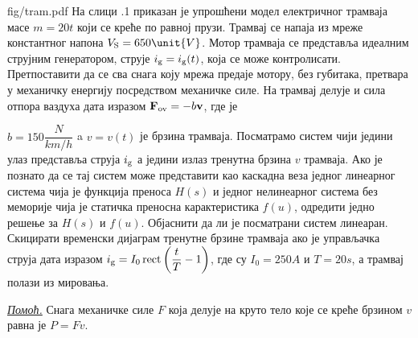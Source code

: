 \newpage
\begin{slikaDesno}[0.83]{fig/tram.pdf}
    \PID 
На слици \ID.1 приказан је упрошћени модел 
електричног трамваја масе $m = 20\unit{t}$ који
се креће по равној прузи. Трамвај 
се напаја из мреже константног напона $V_{\rm S} = 
650\unit{V}$. Мотор трамваја се представља 
идеалним струјним генератором, струје 
$i_{\rm g} = i_{\rm g}(t)$, која се 
може контролисати. Претпоставити да се сва снага
коју мрежа предаје мотору, без губитака, претвара у механичку 
енергију посредством механичке силе. 
На трамвај делује и сила отпора ваздуха
дата изразом ${\bf F}_{\rm ov} = -b {\bf v}$, где је\linebreak 
\vspace*{-3mm}
\end{slikaDesno} 
$b = 150\unit{\dfrac{N}{km/h}}$ a 
$v = v(t)$ је брзина трамваја.
Посматрамо систем чији једини
улаз представља струја $i_{\rm g}$ а једини
излаз тренутна брзина $v$ трамваја. 
Ако је познато да се тај систем може представити 
као каскадна веза једног линеарног система 
чија је функција преноса $H(s)$ и једног 
нелинеарног система без меморије чија је 
статичка преносна карактеристика $f(u)$,
одредити једно решење за 
$H(s)$ и $f(u)$. Објаснити да ли 
је посматрани систем линеаран.
Скицирати временски дијаграм тренутне брзине 
трамваја ако је управљачка струја дата изразом
$i_{\rm g} = I_0 \operatorname{rect}
\left( \dfrac{t}{T} - 1 \right)$,
где су $I_0 = 250\unit{A}$ и $T = 20\unit{s}$,
а трамвај полази из мировања.
\vspace*{1mm}

\noindent
\textit{\underline{Помоћ.}} Снага механичке силе $F$ која 
делује на круто тело које се креће брзином $v$ 
равна је $P = Fv$. \\

